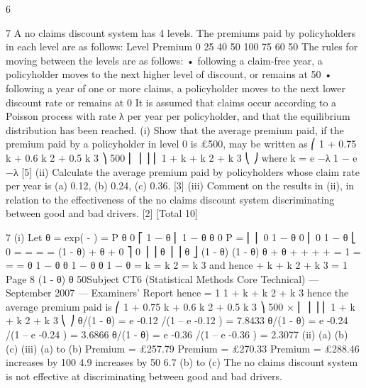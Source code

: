 6\documentclass[a4paper,12pt]{article}
\begin{document}
7
A no claims discount system has 4 levels. The premiums paid by policyholders in
each level are as follows:
Level Premium
0
25
40
50 100%
75%
60%
50%
The rules for moving between the levels are as follows:
• following a claim-free year, a policyholder moves to the next higher level of
discount, or remains at 50%
• following a year of one or more claims, a policyholder moves to the next lower
discount rate or remains at 0%
It is assumed that claims occur according to a Poisson process with rate λ per year per
policyholder, and that the equilibrium distribution has been reached.
(i)
Show that the average premium paid, if the premium paid by a policyholder in
level 0 is £500, may be written as
⎛ 1 + 0.75 k + 0.6 k 2 + 0.5 k 3 ⎞
500 ⎜
⎟ ⎟
⎜
1 + k + k 2 + k 3
⎝
⎠
where k =
e −λ
1 − e −λ
[5]
(ii) Calculate the average premium paid by policyholders whose claim rate per
year is (a) 0.12, (b) 0.24, (c) 0.36.
[3]
(iii) Comment on the results in (ii), in relation to the effectiveness of the no claims
discount system discriminating between good and bad drivers.
[2]
[Total 10]


7
(i)
Let θ = exp( - \lambda )
\pi  = \pi  P
θ
0
⎡ 1 − θ
⎢ 1 − θ
θ
0
P = ⎢
⎢ 0 1 − θ
0
⎢
0 1 − θ
⎣ 0
=
=
=
=
(1 - θ)  +
θ  +
0 ⎤
0 ⎥ ⎥
θ ⎥
⎥
θ ⎦
(1 - θ) 
(1 - θ) 
θ  +
θ  +
 +  +  +  = 1
 =
 =
 =
θ
1 − θ
θ
1 − θ
θ
1 − θ
= k
= k 2 
= k 3 
and hence  + k  + k 2  + k 3  = 1
Page 8
(1 - θ) 
θ \pi  50Subject CT6 (Statistical Methods Core Technical) — September 2007 — Examiners’ Report
hence  =
1
1 + k + k 2 + k 3
hence the average premium paid is
⎛ 1 + 0.75 k + 0.6 k 2 + 0.5 k 3 ⎞
500 × ⎜
⎟ ⎟
⎜
1 + k + k 2 + k 3
⎝
⎠
θ/(1 - θ) = e -0.12 /(1 – e -0.12 ) = 7.8433
θ/(1 - θ) = e -0.24 /(1 – e -0.24 ) = 3.6866
θ/(1 - θ) = e -0.36 /(1 – e -0.36 ) = 2.3077
(ii) (a)
(b)
(c)
(iii) (a) to (b)
Premium = £257.79
Premium = £270.33
Premium = £288.46
\lambda  increases by 100%
4.9%
\lambda  increases by 50%
6.7%
(b) to (c)
The no claims discount system is not effective at discriminating between good
and bad drivers.
\end{document}
